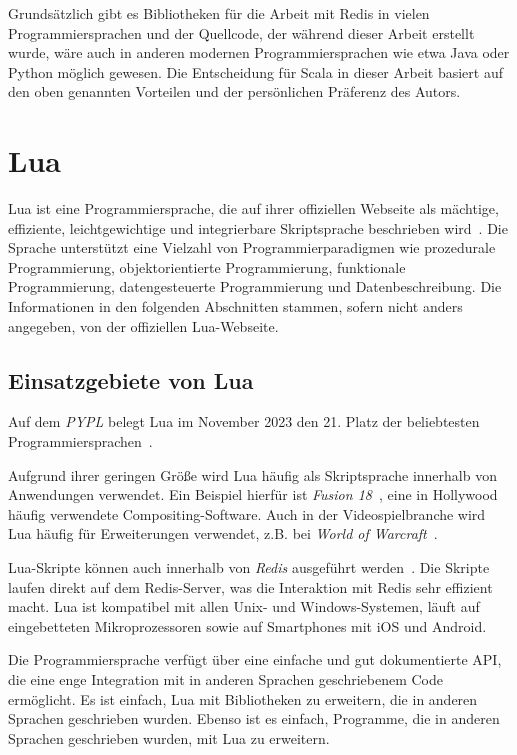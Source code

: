 Grundsätzlich gibt es Bibliotheken für die Arbeit mit Redis in vielen Programmiersprachen und der Quellcode, der während dieser Arbeit erstellt wurde, wäre auch in anderen modernen Programmiersprachen wie etwa Java oder Python möglich gewesen.
Die Entscheidung für Scala in dieser Arbeit basiert auf den oben genannten Vorteilen und der persönlichen Präferenz des Autors.


\section{Lua}
Lua ist eine Programmiersprache, die auf ihrer offiziellen Webseite als mächtige, effiziente, leichtgewichtige und integrierbare Skriptsprache beschrieben wird~\cite{ierusalimschy_lua_nodate}. Die Sprache unterstützt eine Vielzahl von Programmierparadigmen wie prozedurale Programmierung, objektorientierte Programmierung, funktionale Programmierung, datengesteuerte Programmierung und Datenbeschreibung. Die Informationen in den folgenden Abschnitten stammen, sofern nicht anders angegeben, von der offiziellen Lua-Webseite.

\subsection{Einsatzgebiete von Lua}
Auf dem \emph{\acf{PYPL}} belegt Lua im November 2023 den 21. Platz der beliebtesten Programmiersprachen~\cite{carbonnelle_pypl_2023}.

Aufgrund ihrer geringen Größe wird Lua häufig als Skriptsprache innerhalb von Anwendungen verwendet. Ein Beispiel hierfür ist \emph{Fusion 18}~\cite{blackmagic_design_fusion_nodate}, eine in Hollywood häufig verwendete Compositing-Software. Auch in der Videospielbranche wird Lua häufig für Erweiterungen verwendet, z.B. bei \emph{World of Warcraft}~\cite{wowpedia_lua_2023}.

Lua-Skripte können auch innerhalb von \emph{Redis} ausgeführt werden~\cite{redis_ltd_scripting_nodate}. Die Skripte laufen direkt auf dem Redis-Server, was die Interaktion mit Redis sehr effizient macht.
Lua ist kompatibel mit allen Unix- und Windows-Systemen, läuft auf eingebetteten Mikroprozessoren sowie auf Smartphones mit iOS und Android.

Die Programmiersprache verfügt über eine einfache und gut dokumentierte API, die eine enge Integration mit in anderen Sprachen geschriebenem Code ermöglicht. Es ist einfach, Lua mit Bibliotheken zu erweitern, die in anderen Sprachen geschrieben wurden. Ebenso ist es einfach, Programme, die in anderen Sprachen geschrieben wurden, mit Lua zu erweitern.
